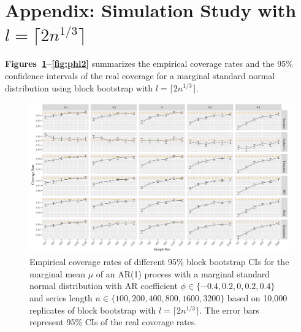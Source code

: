 \documentclass[10pt]{article}
\begin{document}
\section*{Appendix: Simulation Study with $l = \lceil 2n^{1/3} \rceil$}

\textbf{Figures~\ref{fig:mu2}--\ref{fig:phi2}} 
summarizes the empirical coverage rates and the 95\% confidence intervals of the 
real coverage for a marginal standard normal distribution using block bootstrap
with $l = \lceil 2n^{1/3} \rceil$.

\begin{figure}[tbp]
  \centering
  \includegraphics[width=\textwidth]{figures/plot_norm_mu_2}
  \caption{Empirical coverage rates of different 95\% block bootstrap CIs for
    the marginal mean $\mu$ of an AR(1) process with a marginal standard 
    normal distribution with AR coefficient
    $\phi \in \{-0.4, 0.2, 0, 0.2, 0.4\}$ and series length
    $n \in \{100, 200, 400, 800, 1600, 3200\}$ based on 10,000 replicates of
    block bootstrap with $l = \lceil 2n^{1/3} \rceil$. The
    error bars represent 95\% CIs of the real coverage rates.}
  \label{fig:mu2}
\end{figure}
\end{document}
